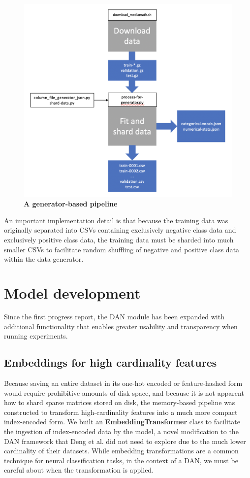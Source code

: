 \documentclass{proc}
\begin{document}
\begin{figure}[h!]
		\includegraphics*[scale=0.45]{../figures/generator-based-pipeline.png}
		\caption{\textbf{A generator-based pipeline}}
		\label{fig:generator-based-pipeline}
\end{figure}

An important implementation detail is that because the training data was originally separated into CSVs containing exclusively negative class data and exclusively positive class data, the training data must be sharded into much smaller CSVs to facilitate random shuffling of negative and positive class data within the data generator.

\section{Model development}

Since the first progress report, the DAN module has been expanded with additional functionality that enables greater usability and transparency when running experiments.

\subsection{Embeddings for high cardinality features}

Because saving an entire dataset in its one-hot encoded or feature-hashed form would require prohibitive amounts of disk space, and because it is not apparent how to shard sparse matrices stored on disk, the memory-based pipeline was constructed to transform high-cardinality features into a much more compact index-encoded form. We built an \textbf{EmbeddingTransformer} class to facilitate the ingestion of index-encoded data by the model, a novel modification to the DAN framework that Deng et al. did not need to explore due to the much lower cardinality of their datasets. While embedding transformations are a common technique for neural classification tasks, in the context of a DAN, we must be careful about when the transformation is applied.
\end{document}
